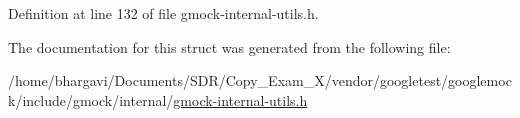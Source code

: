 Definition at line 132 of file gmock-\/internal-\/utils.\+h.



The documentation for this struct was generated from the following file\+:\begin{DoxyCompactItemize}
\item 
/home/bhargavi/\+Documents/\+S\+D\+R/\+Copy\+\_\+\+Exam\+\_\+X/vendor/googletest/googlemock/include/gmock/internal/\hyperlink{gmock-internal-utils_8h}{gmock-\/internal-\/utils.\+h}\end{DoxyCompactItemize}
